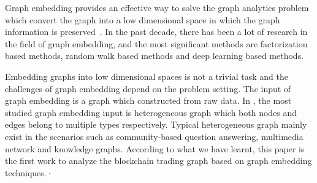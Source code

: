 Graph embedding provides an effective way to solve the graph analytics problem which convert the graph into a low dimensional space in which the graph information is preserved~\cite{hamilton2017representation}. In the past decade, there has been a lot of research in the field of graph embedding, and the most significant methods are factorization based methods\cite{ahmed2013distributed,belkin2002laplacian,roweis2000nonlinear}, random walk based methods\cite{perozzi2014deepwalk,grover2016node2vec} and deep learning based methods\cite{wang2016structural,kipf2016semi}. 

Embedding graphs into low dimensional spaces is not a trivial task and the challenges of graph embedding depend on the problem setting. The input of graph embedding is a graph which constructed from raw data. In \cite{goyal2018graph}, the most studied graph embedding input is heterogeneous graph which both nodes and edges belong to multiple types respectively. Typical heterogeneous graph mainly exist in the scenarios such as community-based question answering, multimedia network and knowledge graphs. According to what we have learnt, this paper is the first work to analyze the blockchain trading graph based on graph embedding techniques.·